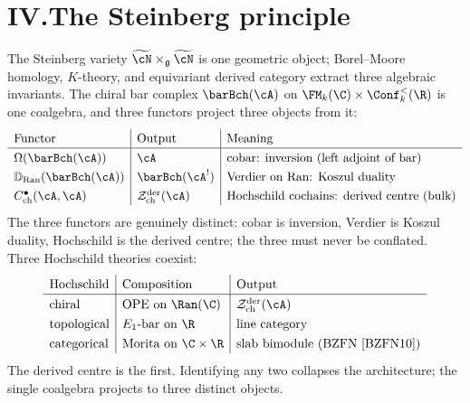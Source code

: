 \section*{IV.\quad The Steinberg principle}

The Steinberg variety
$\widetilde{\cN} \times_{\fg} \widetilde{\cN}$ is one geometric
object; Borel--Moore homology, $K$-theory, and equivariant
derived category extract three algebraic invariants. The chiral
bar complex $\barBch(\cA)$ on
$\FM_k(\C) \times \Conf_k^{<}(\R)$ is one coalgebra, and three
functors project three objects from it:
\[
\renewcommand{\arraystretch}{1.3}
\begin{array}{l|l|l}
\text{Functor} & \text{Output} & \text{Meaning} \\
\hline
\Omega(\barBch(\cA)) & \cA &
 \text{cobar: inversion (left adjoint of bar)} \\
\mathbb{D}_{\mathrm{Ran}}(\barBch(\cA)) &
 \barBch(\cA^!) & \text{Verdier on Ran: Koszul duality} \\
C^\bullet_{\mathrm{ch}}(\cA,\cA) &
 \cZ^{\mathrm{der}}_{\mathrm{ch}}(\cA) &
 \text{Hochschild cochains: derived centre (bulk)}
\end{array}
\]
The three functors are genuinely distinct: cobar is inversion,
Verdier is Koszul duality, Hochschild is the derived centre; the
three must never be conflated. Three Hochschild theories coexist:
\[
\renewcommand{\arraystretch}{1.3}
\begin{array}{l|l|l}
\text{Hochschild} & \text{Composition} & \text{Output} \\
\hline
\text{chiral} & \text{OPE on } \Ran(\C) &
 \cZ^{\mathrm{der}}_{\mathrm{ch}}(\cA) \\
\text{topological} & E_1\text{-bar on } \R &
 \text{line category} \\
\text{categorical} & \text{Morita on } \C \times \R &
 \text{slab bimodule (BZFN~\cite{BZFN10})}
\end{array}
\]
The derived centre is the first. Identifying any two collapses
the architecture; the single coalgebra projects to three distinct
objects.

